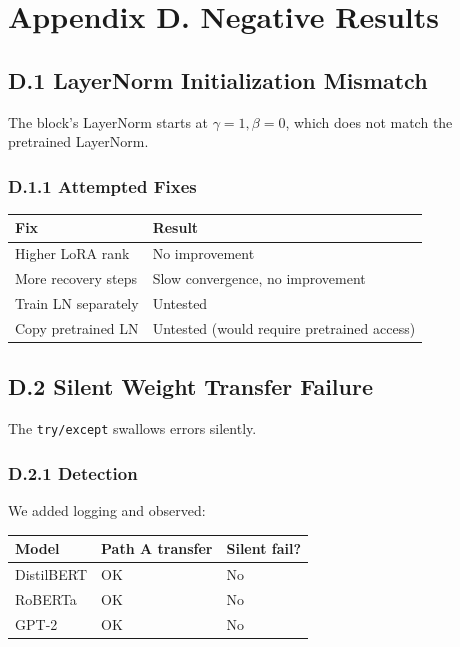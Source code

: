 
\section{Appendix D. Negative Results}

\subsection{D.1 LayerNorm Initialization Mismatch}

The block's LayerNorm starts at $\gamma = 1, \beta = 0$, which does not 
match the pretrained LayerNorm.

\subsubsection{D.1.1 Attempted Fixes}

\begin{table}[H]
\centering
\small
\begin{tabular}{ll}
\toprule
\textbf{Fix} & \textbf{Result} \\
\midrule
Higher LoRA rank & No improvement \\
More recovery steps & Slow convergence, no improvement \\
Train LN separately & Untested \\
Copy pretrained LN & Untested (would require pretrained access) \\
\bottomrule
\end{tabular}
\end{table}

\subsection{D.2 Silent Weight Transfer Failure}

The \texttt{try/except} swallows errors silently.

\subsubsection{D.2.1 Detection}

We added logging and observed:

\begin{table}[H]
\centering
\small
\begin{tabular}{lll}
\toprule
\textbf{Model} & \textbf{Path A transfer} & \textbf{Silent fail?} \\
\midrule
DistilBERT & OK & No \\
RoBERTa & OK & No \\
GPT-2 & OK & No \\
\bottomrule
\end{tabular}
\end{table}

